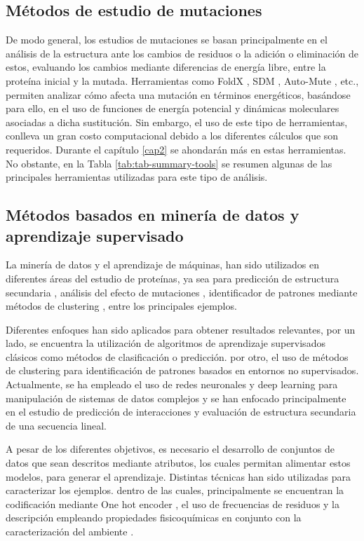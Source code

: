 \subsection{Métodos de estudio de mutaciones}

De modo general, los estudios de mutaciones se basan principalmente en el análisis de la estructura ante los cambios de residuos o la adición o eliminación de estos, evaluando los cambios mediante diferencias de energía libre, entre la proteína inicial y la mutada. Herramientas como FoldX \cite{Schymkowitz2005}, SDM \cite{Pandurangan2017}, Auto-Mute \cite{Masso2010}, etc., permiten analizar cómo afecta una mutación en términos energéticos, basándose para ello, en el uso de funciones de energía potencial y dinámicas moleculares asociadas a dicha sustitución. Sin embargo, el uso de este tipo de herramientas, conlleva un gran costo computacional debido a los diferentes cálculos que son requeridos. Durante el capítulo \ref{cap2} se ahondarán más en estas herramientas. No obstante, en la Tabla \ref{tab:tab-summary-tools} se resumen algunas de las principales herramientas utilizadas para este tipo de análisis.

\subsection{Métodos basados en minería de datos y aprendizaje supervisado}

La minería de datos y el aprendizaje de máquinas, han sido utilizados en diferentes áreas del estudio de proteínas, ya sea para predicción de estructura secundaria \cite{hua2001novel, Muggleton1992, WANG2008262}, análisis del efecto de mutaciones \cite{capriotti2005mutant2, capriotti2008three, vaisman}, identificador de patrones mediante métodos de clustering \cite{schueler2003conserved, orengo1997cath}, entre los principales ejemplos.

Diferentes enfoques han sido aplicados para obtener resultados relevantes, por un lado, se encuentra la utilización de algoritmos de aprendizaje supervisados clásicos como métodos de clasificación o predicción. por otro, el uso de métodos de clustering para identificación de patrones basados en entornos no supervisados. Actualmente, se ha empleado el uso de redes neuronales y deep learning para manipulación de sistemas de datos complejos y se han enfocado principalmente en el estudio de predicción de interacciones y evaluación de estructura secundaria de una secuencia lineal.

A pesar de los diferentes objetivos, es necesario el desarrollo de conjuntos de datos que sean descritos mediante atributos, los cuales permitan alimentar estos modelos, para generar el aprendizaje. Distintas técnicas han sido utilizadas para caracterizar los ejemplos. dentro de las cuales, principalmente se encuentran la codificación mediante One hot encoder \cite{pedregosa2011scikit}, el uso de frecuencias de residuos \cite{ozbudak2014protein} y la descripción empleando propiedades fisicoquímicas en conjunto con la caracterización del ambiente \cite{capriotti2005mutant2, capriotti2008three}.

